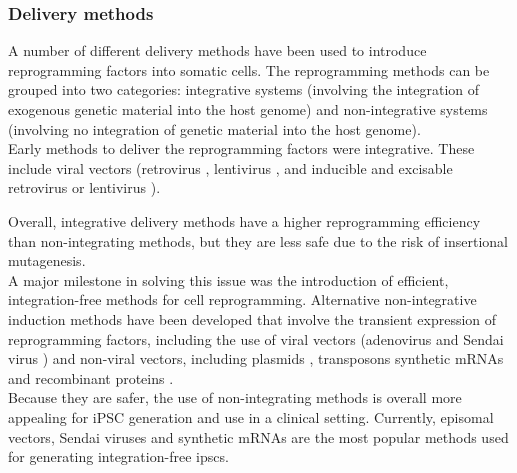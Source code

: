 \clearpage

\subsubsection{Delivery methods}
\label{sec:ipsc_delivery}

A number of different delivery methods have been used to introduce reprogramming factors into somatic cells. 
The reprogramming methods can be grouped into two categories: integrative systems (involving the integration of exogenous genetic material into the host genome) and non-integrative systems (involving no integration of genetic material into the host genome). \\

Early methods to deliver the reprogramming factors were integrative.
These include viral vectors (retrovirus \cite{takahashi2006induction, takahashi2007induction, wernig2007vitro, okita2007generation, yamanaka2007strategies, maherali2007directly}, lentivirus \cite{yu2007induced, blelloch2007generation}, and 
inducible and 
excisable retrovirus \cite{soldner2009parkinson} or
lentivirus \cite{maherali2008high}). 

Overall, integrative delivery methods have a higher reprogramming efficiency than non-integrating methods, but they are less safe due to the risk of insertional mutagenesis. \\

A major milestone in solving this issue was the introduction of efficient, integration-free methods for cell reprogramming. 
Alternative non-integrative induction methods have been developed that involve the transient expression of reprogramming factors, including the use of viral vectors (adenovirus \cite{stadtfeld2008reprogramming} and Sendai virus \cite{fusaki2009efficient, nishimura2011development}) and non-viral vectors, including plasmids \cite{yu2009human, okita2008generation, okita2011more, jia2010nonviral}, transposons \cite{kaji2009virus, woltjen2009piggybac, yu2009human} synthetic mRNAs \cite{warren2010highly} and recombinant proteins \cite{kim2009generation}. \\

Because they are safer, the use of non-integrating methods is overall more appealing for iPSC generation and use in a clinical setting.
Currently, episomal vectors, Sendai viruses and synthetic mRNAs are the most popular methods used for generating integration-free \glspl{ipsc}. 


